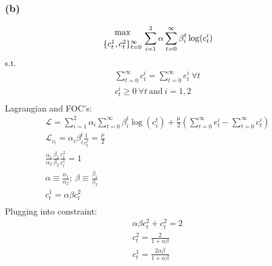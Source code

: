 \documentclass[10pt, a4paper]{article}
\begin{document}
    \subsubsection*{(b)}
      \begin{gather*}
        {\max\atop{\{c_t^1,c_t^2\}_{t=0}^{\infty}}} \sum\limits_{i=1}^{2}\alpha\sum\limits_{t=0}^{\infty}\beta_i^t\log(c_t^i) \\
      \end{gather*}
      s.t.
      \begin{gather*}
        \sum\limits_{t=0}^{\infty}c_t^i = \sum\limits_{t=0}^{\infty}e_t^i \ \forall t\\
        c_t^i \geq 0 \ \forall t \ \text{and} \ i = 1,2 \\
      \end{gather*}
      Lagrangian and FOC's:
      \begin{gather*}
        \mathcal{L} = \sum\limits_{i=1}^2\alpha_i\sum\limits_{t=0}^{\infty}\beta_i^t\log(c_i^t) + \frac{\mu}{2}(\sum\limits_{t=0}^{\infty}e_t^i-\sum\limits_{t=0}^{\infty}c_t^i) \\
        \mathcal{L}_{c_t} = \alpha_i\beta_i^t\frac{1}{c_t^i} = \frac{\mu}{2} \\
        \frac{\alpha_1}{\alpha_2}\frac{\beta_1}{\beta_2}\frac{c_t^2}{c_t^1} = 1 \\
        \alpha\equiv\frac{\alpha_1}{\alpha_2}; \ \beta\equiv\frac{\beta_1}{\beta_2} \\
        c_t^1 = \alpha\beta c_t^2 \\
      \end{gather*}
      Plugging into constraint:
      \begin{gather*}
        \alpha\beta c_t^2 + c_t^2 = 2 \\
        \boxed{c_t^2 = \frac{2}{1+\alpha\beta}} \\
        \boxed{c_t^1 = \frac{2\alpha\beta}{1+\alpha\beta}}
      \end{gather*}
\end{document}
